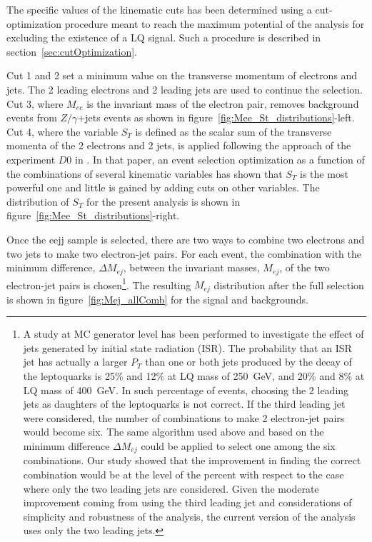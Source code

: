 The specific values of the kinematic cuts has been determined using a cut-optimization procedure meant to
reach the maximum potential of the analysis for excluding the existence of a LQ signal. 
Such a procedure is described in section~\ref{sec:cutOptimization}.

Cut 1 and 2 set a minimum value on the transverse momentum of electrons and jets. 
The 2 leading electrons and 2 leading jets are used to continue the selection.
Cut 3, where $M_{ee}$ is the invariant mass of the electron pair, removes background events from 
$Z/\gamma$+jets events as shown in figure~\ref{fig:Mee_St_distributions}-left.
Cut 4, where the variable $S_T$ is defined as the scalar sum of the transverse momenta of the 
2 electrons and 2 jets, is applied following the approach of the experiment $D0$ in 
\cite{Abazov:2001mx}. In that paper, an event selection optimization as a function of
the combinations of several kinematic variables has shown that $S_T$ is the most powerful one 
and little is gained by adding cuts on other variables. The distribution of $S_T$ for the present
analysis is shown in figure~\ref{fig:Mee_St_distributions}-right.

Once the eejj sample is selected, there are two ways to combine two electrons and two jets to make two electron-jet pairs. 
For each event, the combination with the minimum difference, $\Delta M_{ej}$, between the invariant masses, $M_{ej}$, 
of the two electron-jet pairs is chosen\footnote{
A study at MC generator level has been performed to investigate the effect of jets generated by initial state 
radiation (ISR). The probability that an ISR jet has actually a larger $P_T$ than one or both jets produced 
by the decay of the leptoquarks is 25\% and 12\% at LQ mass of 250~GeV, and 20\% and 8\% at LQ mass of 400~GeV. 
In such percentage of events, choosing the 2 leading jets as daughters of the leptoquarks is not correct. 
If the third leading jet were considered, the number of combinations to make 2 electron-jet pairs would become six.
The same algorithm used above and based on the minimum difference $\Delta M_{ej}$ could be applied to select one 
among the six combinations. Our study showed that the improvement in finding the correct combination would be at the level
of the percent with respect to the case where only the two leading jets are considered.
Given the moderate improvement coming from using the third leading jet and considerations of simplicity and robustness
of the analysis, the current version of the analysis uses only the two leading jets.
}. 
The resulting $M_{ej}$ distribution after the full selection is shown in figure~\ref{fig:Mej_allComb} for the signal and backgrounds. 


